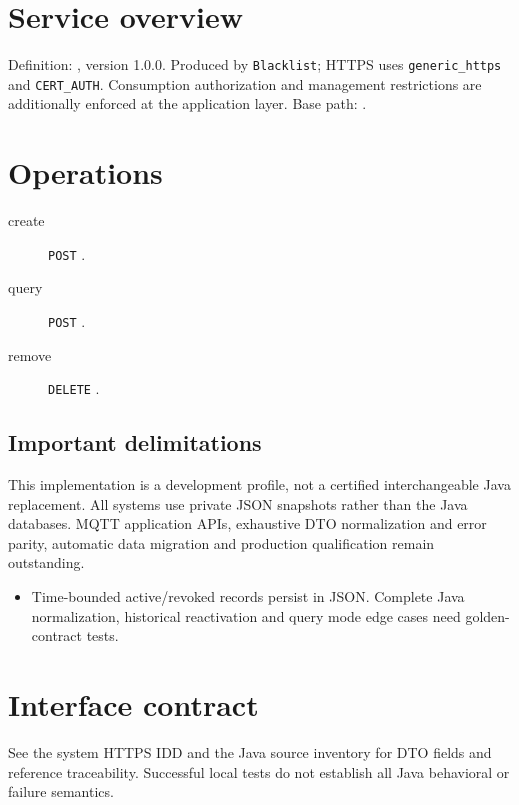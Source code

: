 \documentclass[a4paper]{arrowhead}
\begin{document}
\ArrowheadSetup
\section{Service overview}
Definition: , version 1.0.0. Produced by \texttt{Blacklist}; HTTPS uses \texttt{generic\_https} and \texttt{CERT\_AUTH}. Consumption authorization and management restrictions are additionally enforced at the application layer. Base path: .
\section{Operations}
\begin{description}
\item[create] \texttt{POST} .
\item[query] \texttt{POST} .
\item[remove] \texttt{DELETE} .
\end{description}
\subsection{Important delimitations}
This implementation is a development profile, not a certified interchangeable Java replacement. All systems use private JSON snapshots rather than the Java databases. MQTT application APIs, exhaustive DTO normalization and error parity, automatic data migration and production qualification remain outstanding.
\begin{itemize}
\item Time-bounded active/revoked records persist in JSON. Complete Java normalization, historical reactivation and query mode edge cases need golden-contract tests.
\end{itemize}
\section{Interface contract}
See the system HTTPS IDD and the Java source inventory for DTO fields and reference traceability. Successful local tests do not establish all Java behavioral or failure semantics.
\end{document}
